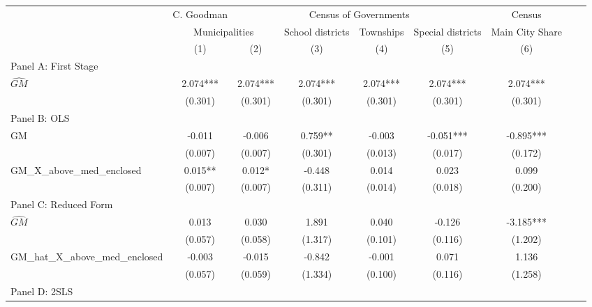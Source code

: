  \begin{tabular}{l*{8}{c}} \toprule
&\multicolumn{1}{c}{C. Goodman}&\multicolumn{4}{c}{Census of Governments}&\multicolumn{1}{c}{Census}\\\cmidrule(lr){2-2}\cmidrule(lr){3-6}\cmidrule(lr){7-7}
&\multicolumn{2}{c}{Municipalities}&\multicolumn{1}{c}{School districts}&\multicolumn{1}{c}{Townships}&\multicolumn{1}{c}{Special districts}&\multicolumn{1}{c}{Main City Share}\\\cmidrule(lr){2-3}\cmidrule(lr){4-6}\cmidrule(lr){7-7}
&\multicolumn{1}{c}{(1)}&\multicolumn{1}{c}{(2)}&\multicolumn{1}{c}{(3)}&\multicolumn{1}{c}{(4)}&\multicolumn{1}{c}{(5)}&\multicolumn{1}{c}{(6)}\\
\cmidrule(lr){1-7}
\multicolumn{6}{l}{Panel A: First Stage}\\
\cmidrule(lr){1-7}
$\widehat{GM}$  &    2.074***&    2.074***&    2.074***&    2.074***&    2.074***&    2.074***\\
                &  (0.301)   &  (0.301)   &  (0.301)   &  (0.301)   &  (0.301)   &  (0.301)   \\
\cmidrule(lr){1-7}
\multicolumn{6}{l}{Panel B: OLS}\\
\cmidrule(lr){1-7}
GM              &   -0.011   &   -0.006   &    0.759** &   -0.003   &   -0.051***&   -0.895***\\
                &  (0.007)   &  (0.007)   &  (0.301)   &  (0.013)   &  (0.017)   &  (0.172)   \\
\addlinespace
GM\_X\_above\_med\_enclosed&    0.015** &    0.012*  &   -0.448   &    0.014   &    0.023   &    0.099   \\
                &  (0.007)   &  (0.007)   &  (0.311)   &  (0.014)   &  (0.018)   &  (0.200)   \\
\cmidrule(lr){1-7}
\multicolumn{6}{l}{Panel C: Reduced Form}\\
\cmidrule(lr){1-7}
$\widehat{GM}$  &    0.013   &    0.030   &    1.891   &    0.040   &   -0.126   &   -3.185***\\
                &  (0.057)   &  (0.058)   &  (1.317)   &  (0.101)   &  (0.116)   &  (1.202)   \\
\addlinespace
GM\_hat\_X\_above\_med\_enclosed&   -0.003   &   -0.015   &   -0.842   &   -0.001   &    0.071   &    1.136   \\
                &  (0.057)   &  (0.059)   &  (1.334)   &  (0.100)   &  (0.116)   &  (1.258)   \\
\cmidrule(lr){1-7}
\multicolumn{6}{l}{Panel D: 2SLS}\\

\end{tabular}
